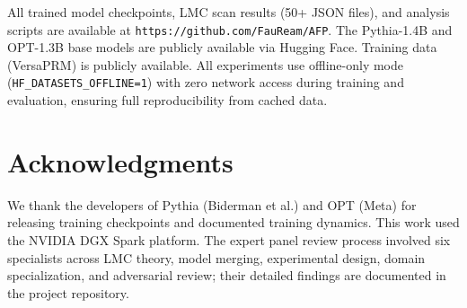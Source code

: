 \documentclass[11pt,a4paper]{article}
\begin{document}
All trained model checkpoints, LMC scan results (50+ JSON files), and analysis scripts are available at \texttt{https://github.com/FauReam/AFP}. The Pythia-1.4B and OPT-1.3B base models are publicly available via Hugging Face. Training data (VersaPRM) is publicly available. All experiments use offline-only mode (\texttt{HF\_DATASETS\_OFFLINE=1}) with zero network access during training and evaluation, ensuring full reproducibility from cached data.

\section*{Acknowledgments}

We thank the developers of Pythia (Biderman et al.) and OPT (Meta) for releasing training checkpoints and documented training dynamics. This work used the NVIDIA DGX Spark platform. The expert panel review process involved six specialists across LMC theory, model merging, experimental design, domain specialization, and adversarial review; their detailed findings are documented in the project repository.
\end{document}
